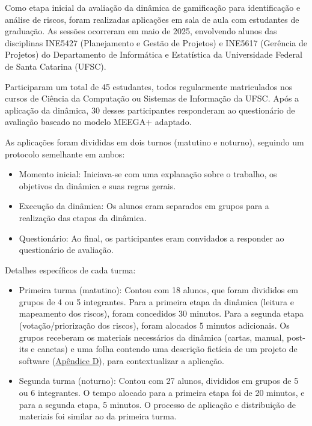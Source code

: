 \documentclass[
	12pt,
	openright,
	twoside,
	a4paper,
	english,
	brazil
	]{abntex2}
\begin{document}
Como etapa inicial da avaliação da dinâmica de gamificação para identificação e análise de riscos, foram realizadas aplicações em sala de aula com estudantes de graduação. As sessões ocorreram em maio de 2025, envolvendo alunos das disciplinas INE5427 (Planejamento e Gestão de Projetos) e INE5617 (Gerência de Projetos) do Departamento de Informática e Estatística da Universidade Federal de Santa Catarina (UFSC).

Participaram um total de 45 estudantes, todos regularmente matriculados nos cursos de Ciência da Computação ou Sistemas de Informação da UFSC. Após a aplicação da dinâmica, 30 desses participantes responderam ao questionário de avaliação baseado no modelo MEEGA+ adaptado.

As aplicações foram divididas em dois turnos (matutino e noturno), seguindo um protocolo semelhante em ambos:
\begin{itemize}
  \item Momento inicial: Iniciava-se com uma explanação sobre o trabalho, os objetivos da dinâmica e suas regras gerais.
  \item Execução da dinâmica: Os alunos eram separados em grupos para a realização das etapas da dinâmica.
  \item Questionário: Ao final, os participantes eram convidados a responder ao questionário de avaliação.
\end{itemize}

Detalhes específicos de cada turma:

\begin{itemize}
  \item Primeira turma (matutino): Contou com 18 alunos, que foram divididos em grupos de 4 ou 5 integrantes. Para a primeira etapa da dinâmica (leitura e mapeamento dos riscos), foram concedidos 30 minutos. Para a segunda etapa (votação/priorização dos riscos), foram alocados 5 minutos adicionais. Os grupos receberam os materiais necessários da dinâmica (cartas, manual, post-its e canetas) e uma folha contendo uma descrição fictícia de um projeto de software (\hyperref[apendiceD]{Apêndice D}), para contextualizar a aplicação.
  \item Segunda turma (noturno): Contou com 27 alunos, divididos em grupos de 5 ou 6 integrantes. O tempo alocado para a primeira etapa foi de 20 minutos, e para a segunda etapa, 5 minutos. O processo de aplicação e distribuição de materiais foi similar ao da primeira turma.
\end{itemize}
\end{document}
